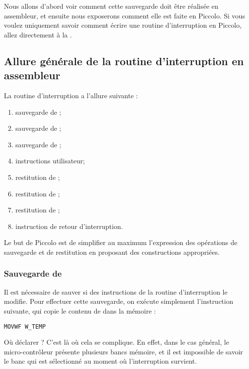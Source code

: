 Nous allons d'abord voir comment cette sauvegarde doit être réalisée en assembleur, et ensuite nous exposerons comment elle est faite en Piccolo. Si vous voulez uniquement savoir comment écrire une routine d'interruption en Piccolo, allez directement à la .

\subsection{Allure générale de la routine d'interruption en assembleur}

La routine d'interruption a l'allure suivante :
\begin{enumerate}
  \item sauvegarde de  ;
  \item sauvegarde de  ;
  \item sauvegarde de  ;
  \item instructions utilisateur;
  \item restitution de  ;
  \item restitution de  ;
  \item restitution de  ;
  \item instruction de retour d'interruption.
\end{enumerate}


Le but de Piccolo est de simplifier au maximum l'expression des opérations de sauvegarde et de restitution en proposant des constructions appropriées.

\subsubsection{Sauvegarde de }

Il est nécessaire de sauver  si des instructions de la routine d'interruption le modifie. Pour effectuer cette sauvegarde, on exécute simplement l'instruction suivante, qui copie le contenu de  dans la mémoire  :

\begin{lstlisting}[language=assembleur]
MOVWF W_TEMP 
\end{lstlisting}

Où déclarer  ? C'est là où cela se complique. En effet, dans le cas général, le micro-contrôleur présente plusieurs bancs mémoire, et il est impossible de savoir le banc qui est sélectionné au moment où l'interruption survient.

